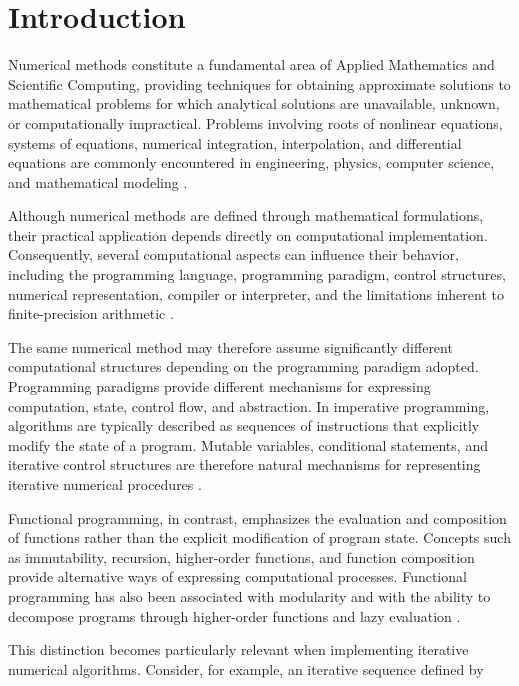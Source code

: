 \chapter{Introduction}
\label{cap:Introduction}

Numerical methods constitute a fundamental area of Applied Mathematics and
Scientific Computing, providing techniques for obtaining approximate solutions
to mathematical problems for which analytical solutions are unavailable,
unknown, or computationally impractical. Problems involving roots of nonlinear
equations, systems of equations, numerical integration, interpolation, and
differential equations are commonly encountered in engineering, physics,
computer science, and mathematical modeling
\cite{burden2016numerical,chapra2021numerical}.

Although numerical methods are defined through mathematical formulations,
their practical application depends directly on computational implementation.
Consequently, several computational aspects can influence their behavior,
including the programming language, programming paradigm, control structures,
numerical representation, compiler or interpreter, and the limitations
inherent to finite-precision arithmetic
\cite{higham2002accuracy}.

The same numerical method may therefore assume significantly different
computational structures depending on the programming paradigm adopted.
Programming paradigms provide different mechanisms for expressing computation,
state, control flow, and abstraction. In imperative programming, algorithms are
typically described as sequences of instructions that explicitly modify the
state of a program. Mutable variables, conditional statements, and iterative
control structures are therefore natural mechanisms for representing
iterative numerical procedures
\cite{scott2015programming,kernighan1988c}.

Functional programming, in contrast, emphasizes the evaluation and composition
of functions rather than the explicit modification of program state. Concepts
such as immutability, recursion, higher-order functions, and function
composition provide alternative ways of expressing computational processes.
Functional programming has also been associated with modularity and with the
ability to decompose programs through higher-order functions and lazy
evaluation
\cite{hughes1989functional}.

This distinction becomes particularly relevant when implementing iterative
numerical algorithms. Consider, for example, an iterative sequence defined by


